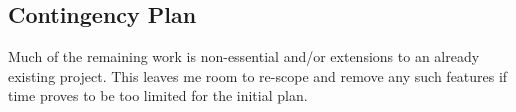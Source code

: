 \subsection{Contingency Plan}

Much of the remaining work is non-essential and/or extensions to an already existing project. This leaves me room to re-scope and remove any such features if time proves to be too limited for the initial plan.
